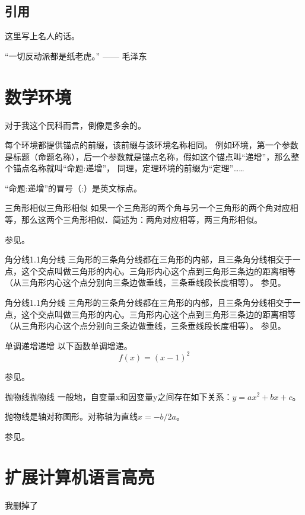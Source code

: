 \documentclass[12pt,A4paper,oneside]{ctexbook}
\begin{document}
\subsection{引用}
\begin{引用}
    这里写上名人的话。

    “一切反动派都是纸老虎。” —— 毛泽东
\end{引用}

\section{数学环境}
对于我这个民科而言，倒像是多余的。

每个环境都提供锚点的前缀，该前缀与该环境名称相同。
例如环境，第一个参数是标题（命题名称），后一个参数就是锚点名称，假如这个锚点叫“递增”，那么整个锚点名称就叫“命题:递增”，
同理，定理环境的前缀为“定理”……

\begin{注意}
    “命题:递增”的冒号（:）是英文标点。
\end{注意}

\begin{定理}{三角形相似}{三角形相似}
    如果一个三角形的两个角与另一个三角形的两个角对应相等，那么这两个三角形相似．简述为：两角对应相等，两三角形相似。

    参见。
\end{定理}

\begin{结论}{角分线1.1}{角分线}
	三角形的三条角分线都在三角形的内部，且三条角分线相交于一点，这个交点叫做三角形的内心。三角形内心这个点到三角形三条边的距离相等（从三角形内心这个点分别向三条边做垂线，三条垂线段长度相等）。
	参见。
\end{结论}

\begin{结论}{角分线1.1}{角分线}
    三角形的三条角分线都在三角形的内部，且三条角分线相交于一点，这个交点叫做三角形的内心。三角形内心这个点到三角形三条边的距离相等（从三角形内心这个点分别向三条边做垂线，三条垂线段长度相等）。
    参见。
\end{结论}

\begin{命题}{单调递增}{递增}
以下函数单调增递。
\[
    f(x) = (x - 1) ^ 2
\]

参见。
\end{命题}

\begin{定义}{抛物线}{抛物线}
    一般地，自变量x和因变量y之间存在如下关系：$y=ax^2+bx+c$。

    抛物线是轴对称图形。对称轴为直线$x=-b/2a$。

    参见。
\end{定义}

\section{扩展计算机语言高亮}
我删掉了
\end{document}
